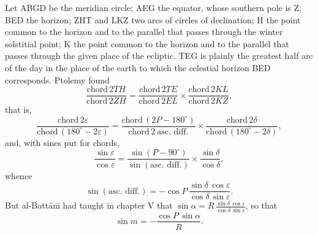 \documentclass[11pt]{article}
\begin{document}
\begin{center}\end{center}
\par Let ABGD be the meridian circle; AEG the equator, whose southern pole is Z; BED the horizon; ZHT and LKZ two arcs of circles of declination; H the point common to the horizon and to the parallel that passes through the winter solstitial point; K the point common to the horizon and to the parallel that passes through the given place of the ecliptic. TEG is plainly the greatest half arc of the day in the place of the earth to which the celestial horizon BED corresponds. Ptolemy found \[ \frac{\text{chord}\,2TH}{\text{chord}\,2ZH} = \frac{\text{chord}\,2TE}{\text{chord}\,2EL} \times \frac{\text{chord}\,2KL}{\text{chord}\,2KZ}, \] that is, \[ \frac{\text{chord}\,2\varepsilon}{\text{chord}\,(180^\circ - 2\varepsilon)} = \frac{\text{chord}\,(2P - 180^\circ)}{\text{chord}\,2\ \text{asc. diff.}} \times \frac{\text{chord}\,2\delta}{\text{chord}\,(180^\circ - 2\delta)}, \] and, with sines put for chords, \[ \frac{\sin\varepsilon}{\cos\varepsilon} = \frac{\sin(P - 90^\circ)}{\sin(\text{asc. diff.})} \times \frac{\sin\delta}{\cos\delta}, \] whence \[ \sin(\text{asc. diff.}) = -\cos P\,\frac{\sin\delta\,\cos\varepsilon}{\cos\delta\,\sin\varepsilon}. \] But al-Battānī had taught in chapter V that $\sin\alpha = R\,\frac{\sin\delta\,\cos\varepsilon}{\cos\delta\,\sin\varepsilon}$, so that \[ \sin m = -\frac{\cos P\,\sin\alpha}{R}. \]\par
\begin{center}\end{center}
\end{document}
